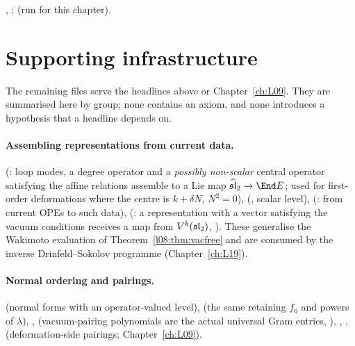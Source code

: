 \begin{status}
\allowbreak{}\allowbreak{}\allowbreak{}\allowbreak{}\allowbreak{}\allowbreak{}, \allowbreak{}\allowbreak{}\allowbreak{}:
\lean{[propext, Classical.}\allowbreak{}\allowbreak\lean{sound]} (run for this chapter).
\end{status}

\section{Supporting infrastructure}\label{l08:sec:infrastructure}

The remaining files serve the headlines above or Chapter~\ref{ch:L09}. They are summarised here by
group; none contains an axiom, and none introduces a hypothesis that a headline depends on.

\paragraph{Assembling representations from current data.}
 (: loop modes, a degree
operator and a \emph{possibly non-scalar} central operator satisfying the affine relations assemble to a
Lie map $\leighthat\to\End E$; used for first-order deformations where the centre is $k+\delta N$, $N^2=0$),
 (, scalar level),
 (: from current OPEs to such data),
 (: a representation with a vector
satisfying the vacuum conditions receives a map from $V^k(\mathfrak{sl}_2)$, \allowbreak{}).
These generalise the Wakimoto evaluation of Theorem~\ref{l08:thm:vacfree} and are consumed by the
inverse Drinfeld--Sokolov programme (Chapter~\ref{ch:L19}).

\paragraph{Normal ordering and pairings.}
 (normal forms with an operator-valued level),
 (the same retaining $f_0$ and powers of $\lambda$),
,  (vacuum-pairing polynomials
are the actual universal Gram entries, \allowbreak{}),
, ,
 (deformation-side pairings; Chapter~\ref{ch:L09}).

